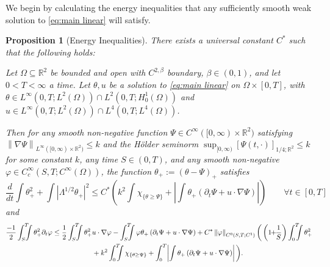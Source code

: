 \documentclass[11pt]{amsart}
\newtheorem{proposition}[theorem]{Proposition}
\theoremstyle{remark}
\theoremstyle{definition}
\newcommand{\R}{\mathbb{R}}
\newcommand{\norm}[1]{\left\lVert#1\right\rVert}
\newcommand{\paren}[1]{\left( #1 \right)}
\newcommand{\bracket}[1]{\left[ #1 \right]}
\newcommand{\abs}[1]{\left\lvert #1 \right\rvert}
\newcommand{\del}{\partial}
\newcommand{\grad}{\nabla}
\newcommand{\ddt}{\frac{d}{dt}}
\newcommand{\indic}[1]{\chi_{\{#1\}}}
\newcommand{\Ctest}{C_c^\infty}
\newcommand{\Csuit}{C^\ast}
\begin{document}
We begin by calculating the energy inequalities that any sufficiently smooth weak solution to \eqref{eq:main linear} will satisfy.  
\begin{proposition}[Energy Inequalities] \label{thm:suitability}
There exists a universal constant $\Csuit$ such that the following holds:

Let $\Omega \subseteq \R^2$ be bounded and open with $C^{2,\beta}$ boundary, $\beta \in (0,1)$, and let $0 < T < \infty$ a time.  Let $\theta, u$ be a solution to \eqref{eq:main linear} on $\Omega \times [0,T]$, with $\theta \in L^\infty(0,T; L^2(\Omega)) \cap L^2(0,T; H_0^1(\Omega))$ and $u \in L^\infty(0,T; L^2(\Omega)) \cap L^4(0,T; L^4(\Omega))$.  

Then for any smooth non-negative function $\Psi \in C^\infty([0,\infty)\times \R^2)$ satisfying $\norm{\grad\Psi}_{L^\infty([0,\infty)\times\R^2)} \leq k$ and the H\"{o}lder seminorm $\sup_{[0,\infty)} \bracket{\Psi(t,\cdot)}_{1/4; \R^2} \leq k$ for some constant $k$, any time $S \in (0,T)$, and any smooth non-negative $\varphi \in \Ctest(S,T;C^\infty(\Omega))$, the function $\theta_+ := \paren{\theta - \Psi}_+$ satisfies
\begin{equation}\label{leray-hopf condition}
\ddt \int \theta_+^2 + \int \abs{\Lambda^{1/2} \theta_+}^2 \leq \Csuit \paren{ k^2 \int \indic{\theta \geq \Psi} + \abs{\int \theta_+ (\del_t \Psi + u\cdot\grad\Psi)} } \qquad \forall t \in [0,T]
\end{equation}
and
\begin{equation} \label{local condition} 
\begin{aligned} 
\frac{-1}{2} \int_S^T\!\!\!\!\int \theta_+^2 \del_t \varphi &\leq \frac{1}{2} \int_S^T\!\!\!\!\int  \theta_+^2 u \cdot \grad \varphi - \int_S^T\!\!\!\!\int \varphi \theta_+ \paren{\del_t \Psi + u \cdot \grad \Psi} 
+ \Csuit \norm{\varphi}_{C^0(S,T;C^1)} \bigg( \paren{1\!\!+\!\!\frac{1}{S}} \int_0^T\!\!\!\!\int \theta_+^2 
\\ & \hskip2cm + k^2 \int_0^T\!\!\!\!\int \indic{\theta\geq\Psi} + \int_0^T\! \abs{\int \theta_+ \paren{\del_t \Psi + u\cdot\grad\Psi}} \bigg).
\end{aligned}

\end{equation}
\end{proposition}
\end{document}
